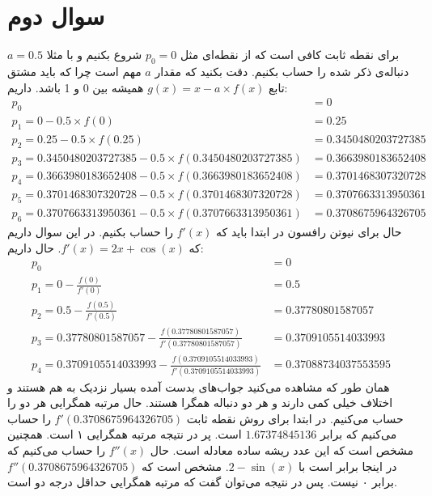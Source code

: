 \documentclass[]{article}
\begin{document}
\section*{سوال دوم}
برای نقطه ثابت کافی است که از نقطه‌ای مثل
$p_0 = 0$
شروع بکنیم و با مثلا
$a = 0.5$
دنباله‌ی ذکر شده را حساب بکنیم. دقت بکنید که مقدار $a$
مهم است چرا که باید مشتق تابع
$g(x) = x - a \times f(x)$
همیشه بین 0 و 1 باشد.
داریم:
\begin{align*}
    p_{0} &= 0\\
    p_{1} = 0 - 0.5 \times f(0) &= 0.25\\
    p_{2} = 0.25 - 0.5 \times f(0.25) &= 0.3450480203727385\\
    p_{3} = 0.3450480203727385 - 0.5 \times f(0.3450480203727385) &= 0.3663980183652408\\
    p_{4} = 0.3663980183652408 - 0.5 \times f(0.3663980183652408) &= 0.3701468307320728\\
    p_{5} = 0.3701468307320728 - 0.5 \times f(0.3701468307320728) &= 0.3707663313950361\\
    p_{6} = 0.3707663313950361 - 0.5 \times f(0.3707663313950361) &= \boxed{0.3708675964326705}
\end{align*}
حال برای نیوتن رافسون در ابتدا باید که
$f'(x)$
را حساب بکنیم. در این سوال داریم که
$f'(x) = 2x + \cos (x)$. حال داریم:
\begin{align*}
    p_{0} &= 0\\
    p_{1} = 0 - \frac{f(0)}{f'(0)} &= 0.5\\
    p_{2} = 0.5 - \frac{f(0.5)}{f'(0.5)} &= 0.37780801587057\\
    p_{3} = 0.37780801587057 - \frac{f(0.37780801587057)}{f'(0.37780801587057)} &= 0.3709105514033993\\
    p_{4} = 0.3709105514033993 - \frac{f(0.3709105514033993)}{f'(0.3709105514033993)} &= \boxed{0.37088734037553595}
\end{align*}
همان طور که مشاهده می‌کنید جواب‌های بدست آمده بسیار نزدیک به هم هستند و اختلاف خیلی کمی دارند و هر دو
دنباله همگرا هستند. حال مرتبه همگرایی هر دو را حساب می‌کنیم. در ابتدا برای روش نقطه ثابت
$f'(0.3708675964326705)$
را حساب می‌کنیم که برابر
$1.67374845136$
است. پر در نتیجه مرتبه همگرایی ۱ است. همچنین مشخص است که این عدد ریشه ساده معادله است. حال
$f''(x)$
را حساب می‌کنیم که در اینجا برابر است با
$2 - \sin (x)$.
مشخص است که
$f''(0.3708675964326705)$
برابر ۰ نیست. پس در نتیجه می‌توان گفت که مرتبه همگرایی حداقل درجه دو است.
\end{document}
